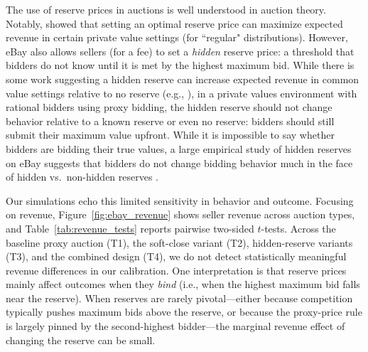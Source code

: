 The use of reserve prices in auctions is well understood in auction theory. Notably, 
\citet{myerson1981optimal} showed that setting an optimal reserve price can maximize expected revenue in certain
private value settings (for ``regular" distributions).
However, eBay also allows sellers (for a fee) to set a {\em hidden} reserve price: a threshold that bidders do not know until it is met by the highest maximum bid. 
While there is some work suggesting a hidden reserve can increase expected revenue in common value settings relative to no reserve (e.g., \citet{vincent1995bidding}), in a private values environment with rational bidders using proxy bidding, the hidden reserve should not change behavior relative to a known reserve or even no reserve: bidders should still submit their maximum value upfront. While it is impossible to say whether bidders are bidding their true values, a large empirical study of hidden reserves on eBay suggests that bidders do not change bidding behavior much in the face of hidden vs.~non-hidden reserves \citep{einav2011learning}. 

Our simulations echo this limited sensitivity in behavior and outcome. Focusing on revenue, Figure~\ref{fig:ebay_revenue} shows seller revenue across auction types, and Table~\ref{tab:revenue_tests} reports pairwise two-sided $t$-tests. Across the baseline proxy auction (T1), the soft-close variant (T2), hidden-reserve variants (T3), and the combined design (T4), we do not detect statistically meaningful revenue differences in our calibration.
%
One interpretation is that reserve prices mainly affect outcomes when they \emph{bind} (i.e., when the highest maximum bid falls near the reserve). When reserves are rarely pivotal---either because competition typically pushes maximum bids above the reserve, or because the proxy-price rule is largely pinned by the second-highest bidder---the marginal revenue effect of changing the reserve can be small.
